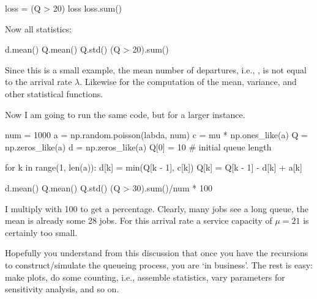 \begin{exercise}
\begin{solution}
\begin{pyconsole}
loss = (Q > 20)
loss
loss.sum()
\end{pyconsole}

Now all statistics:

\begin{pyconsole}
d.mean()
Q.mean()
Q.std()
(Q > 20).sum()
\end{pyconsole}
  

Since this is a small example, the mean number of departures, i.e.,
, is not equal to the arrival rate $\lambda$.  
Likewise for the computation of the mean, variance, and other
statistical functions. 

Now I am going to run the same code, but for a larger instance. 

\begin{pyconsole}
num = 1000
a = np.random.poisson(labda, num)
c = mu * np.ones_like(a)
Q = np.zeros_like(a)
d = np.zeros_like(a)
Q[0] = 10  # initial queue length

for k in range(1, len(a)):
    d[k] = min(Q[k - 1], c[k])
    Q[k] = Q[k - 1] - d[k] + a[k]

d.mean()
Q.mean()
Q.std()
(Q > 30).sum()/num * 100
\end{pyconsole}


I multiply with 100 to get a percentage. Clearly, many jobs see a long
queue, the mean is already some 28 jobs. For this arrival rate a
service capacity of $\mu=21$ is certainly too small. 


Hopefully you
understand from this discussion that once you have the recursions to
construct/simulate the queueing process, you are `in business'. The
rest is easy: make plots, do some counting, i.e., assemble statistics,
vary parameters for sensitivity analysis, and so on.


\end{solution}
\end{exercise}


